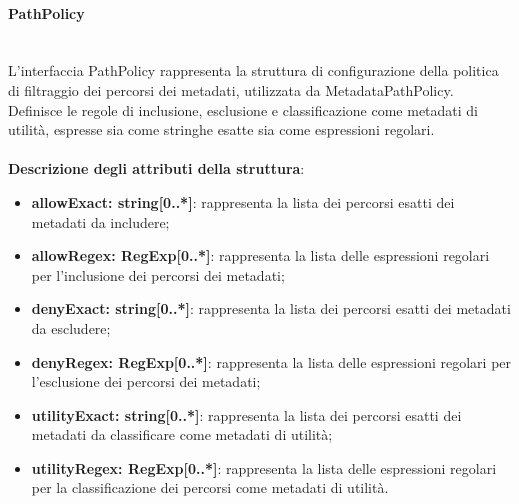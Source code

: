 \documentclass[a4paper,12pt]{article}
\begin{document}
{                \paragraph{PathPolicy}\label{par:PathPolicy}\mbox{}\\
                L'interfaccia PathPolicy rappresenta la struttura di configurazione della politica di filtraggio dei percorsi dei metadati, utilizzata da MetadataPathPolicy. Definisce le regole di inclusione, esclusione e classificazione come metadati di utilità, espresse sia come stringhe esatte sia come espressioni regolari.\\
                \\
                \textbf{Descrizione degli attributi della struttura}:
                \begin{itemize}
                    \item \textbf{allowExact: string[0..*]}: rappresenta la lista dei percorsi esatti dei metadati da includere;
                    \item \textbf{allowRegex: RegExp[0..*]}: rappresenta la lista delle espressioni regolari per l'inclusione dei percorsi dei metadati;
                    \item \textbf{denyExact: string[0..*]}: rappresenta la lista dei percorsi esatti dei metadati da escludere;
                    \item \textbf{denyRegex: RegExp[0..*]}: rappresenta la lista delle espressioni regolari per l'esclusione dei percorsi dei metadati;
                    \item \textbf{utilityExact: string[0..*]}: rappresenta la lista dei percorsi esatti dei metadati da classificare come metadati di utilità;
                    \item \textbf{utilityRegex: RegExp[0..*]}: rappresenta la lista delle espressioni regolari per la classificazione dei percorsi come metadati di utilità.
                \end{itemize}

}
\end{document}
